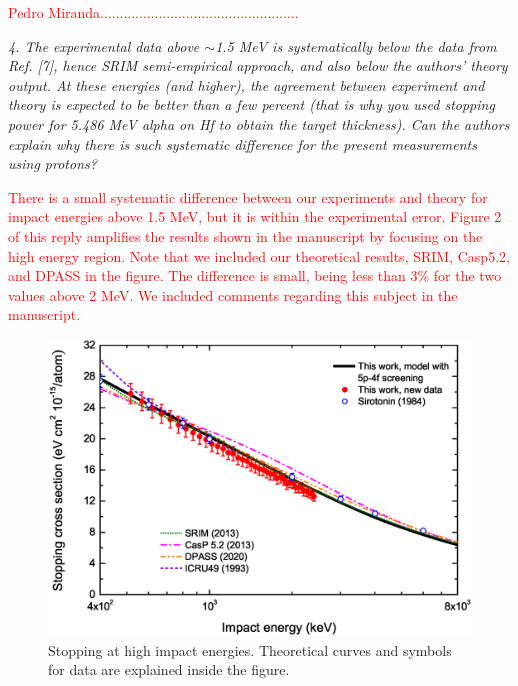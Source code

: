 \documentclass[a4paper,10pt]{article}
\def\reviewer#1{\vspace{0.35cm}\textsl{#1}}
\def\reply#1{\vspace{0.1cm}\textcolor{red}{#1}}
\begin{document}
\reply{Pedro Miranda...................................................}

\reviewer{4. The experimental data above $\sim$1.5 MeV is systematically 
below the data from Ref. [7], hence SRIM semi-empirical approach, and 
also below the authors’ theory output. At these energies (and higher), 
the agreement between experiment and theory is expected to be better 
than a few percent (that is why you used stopping power for 5.486 MeV 
alpha on Hf to obtain the target thickness). Can the authors explain why
there is such systematic difference for the present measurements using
protons?}

\reply{There is a small systematic difference between our experiments and theory for impact energies above 1.5 MeV, but it is within the experimental error. Figure 2 of this reply amplifies the results shown in the manuscript by focusing on the high energy region. Note that we included our theoretical results, SRIM, Casp5.2, and DPASS in the figure. The difference is small, being less than 3\% for the two values above 2 MeV. We included comments regarding this subject in the manuscript.}

\begin{figure}[!t]
\centering
\includegraphics[width=12.cm]{Fig04.eps}
\caption{Stopping at high impact energies. Theoretical curves and
symbols for data are explained inside the figure.}
\label{highE}
\end{figure}
\end{document}
